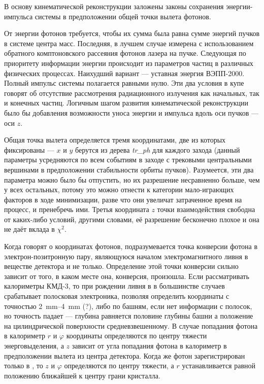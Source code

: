 В основу кинематической реконструкции заложены законы сохранения энергии-импульса системы в предположении общей точки вылета фотонов.

От энергии фотонов требуется, чтобы их сумма была равна сумме энергий пучков в системе центра масс. Последняя, в лучшем случае измерена с использованием обратного комптоновского рассеяния фотонов лазера на пучке. Следующая по приоритету информации энергии происходит из параметров частиц в различных физических процессах. Наихудший вариант --- уставная энергия ВЭПП-2000. Полный импульс системы полагается равными нулю. Эти два условия в купе говорят об отсутствие рассмотрения радиационного излучения как начальных, так и конечных частиц.
Логичным шагом развития кинематической реконструкции было бы добавления возможности уноса энергии и импульса вдоль оси пучков --- оси $z$.

Общая точка вылета определяется тремя координатами, две из которых фиксированы --- $x$ и $y$ берутся из дерева \textit{tr\_ph} для каждого захода (данный параметры усредняются по всем событиям в заходе с трековыми центральными вершинами в предположении стабильности орбиты пучков).
Разумеется, эти два параметра можно было бы отпустить, но их разрешение несравненно больше, чем у всех остальных, потому это можно отнести к категории мало-играющих факторов в ходе минимизации, разве что они увеличат затраченное время на процесс, и пренебречь ими. 
Третья координата $z$ точки взаимодействия свободна от каких-либо условий, другими словами, её разрешение бесконечно плохое и она не даёт вклада в $\chi^2$.

Когда говорят о координатах фотонов, подразумевается точка конверсии фотона в электрон-позитронную пару, 
являющуюся началом электромагнитного ливня в веществе детектора и не только. 
Определение этой точки конверсии сильно зависит от того, в каком месте она, конверсия, произошла.
Если рассматривать калориметры КМД-3, 
то при рождении ливня в  в большинстве случаев срабатывает полосковая электроника, позволяя определить координаты с точностью \SIrange[range-phrase=--]{2}{4}{\mm} (?), 
либо по башням, если нет информации с полосок, но точность падает --- глубина равняется половине глубины башни а положение на цилиндрической поверхности средневзвешенному. 
В случае попадания фотона в  калориметр $r$ и $\varphi$ координаты определяются по центру тяжести энерговыделения, 
а $z$ зависит от угла попадания фотона в калориметр в предположении вылета из центра детектора. 
Когда же фотон зарегистрирован только в , то $z$ и $\varphi$ определяются по центру тяжести, 
а $r$ устанавливается равной положению ближайшей к центру грани кристалла.

